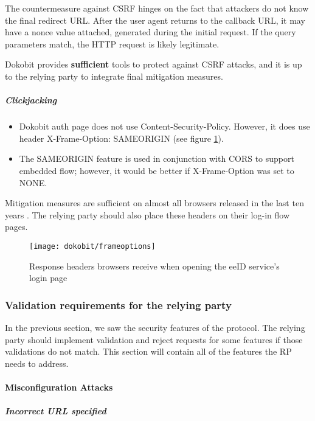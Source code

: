 The countermeasure against CSRF hinges on the fact that attackers do not know the final redirect URL. After the user agent returns to the callback URL, it may have a nonce value attached, generated during the initial request. If the query parameters match, the HTTP request is likely legitimate.

Dokobit provides \textbf{sufficient} tools to protect against CSRF attacks, and it is up to the relying party to integrate final mitigation measures.

\subparagraph{Clickjacking}

\begin{itemize}
  \item Dokobit auth page does not use Content-Security-Policy. However, it does use header X-Frame-Option: {SAMEORIGIN} (see figure \ref{fig:dokobit-responseheaders}).
  \item The {SAMEORIGIN} feature is used in conjunction with CORS to support embedded flow; however, it would be better if X-Frame-Option was set to {NONE}.
\end{itemize}

Mitigation measures are sufficient on almost all browsers released in the last ten years \cite{caniuse-xframeoptions}. The relying party should also place these headers on their log-in flow pages.

\begin{figure}
  \centering
  \texttt{[image: dokobit/frameoptions]}
  \caption{Response headers browsers receive when opening the eeID service's login page}
  \label{fig:dokobit-responseheaders}
\end{figure}

\subsubsection{Validation requirements for the relying party}

In the previous section, we saw the security features of the protocol. The relying party should implement validation and reject requests for some features if those validations do not match. This section will contain all of the features the RP needs to address.

\paragraph{Misconfiguration Attacks}

\subparagraph{Incorrect URL specified}


